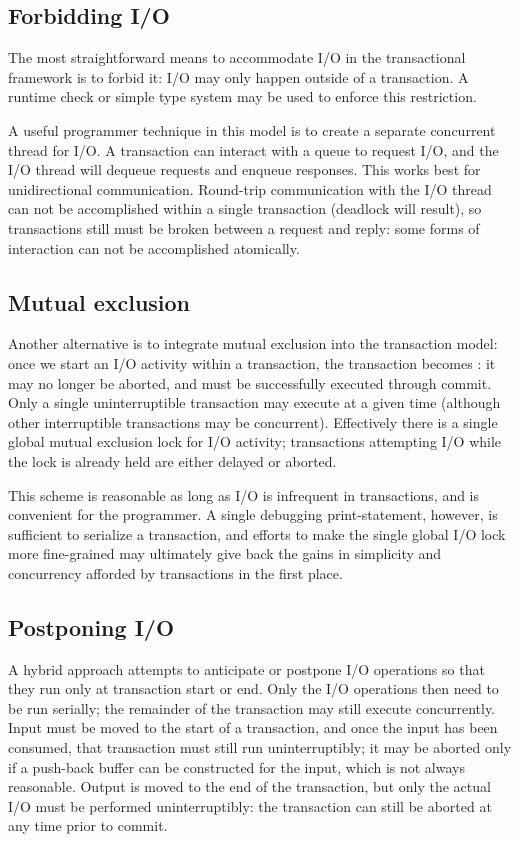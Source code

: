 \subsection{Forbidding I/O}
The most straightforward means to accommodate I/O in the
transactional framework is to forbid it: I/O may only happen outside
of a transaction.  A runtime check or simple type system may be used
to enforce this restriction.

A useful programmer technique in this model is to create a separate concurrent
thread for I/O\@.  A transaction can interact with a queue to request
I/O, and the I/O thread will dequeue requests and enqueue responses.
This works best for unidirectional communication.
Round-trip communication with the I/O thread can not be accomplished
within a single transaction (deadlock will result), so transactions
still must be broken between a request and reply: some forms of
interaction can not be accomplished atomically.

\subsection{Mutual exclusion}
Another alternative is to integrate mutual exclusion into the
transaction model: once we start an I/O activity within a transaction,
the transaction becomes : it may no longer be
aborted, and must be successfully executed through commit.
Only a single uninterruptible transaction may execute at a given time
(although other interruptible transactions may be concurrent).
Effectively there is a single global mutual exclusion lock for I/O
activity; transactions attempting I/O while the lock is already held
are either delayed or aborted.

This scheme is reasonable as long as I/O is infrequent in
transactions, and is convenient for the programmer.
A single debugging print-statement, however, is sufficient to
serialize a transaction, and efforts to make the single global I/O
lock more fine-grained may ultimately give back the gains in
simplicity and concurrency afforded by transactions in the first place.

\subsection{Postponing I/O}
A hybrid approach attempts to anticipate or postpone I/O operations so
that they run only at transaction start or end.
Only the I/O operations then need to be run serially; the remainder of
the transaction may still execute concurrently.  Input must be moved
to the start of a transaction, and once the input has been consumed,
that transaction must still run uninterruptibly; it may be aborted
only if a push-back buffer can be constructed for the input, which is
not always reasonable.  Output is moved to the end of the transaction,
but only the actual I/O must be performed uninterruptibly: the
transaction can still be aborted at any time prior to commit.

